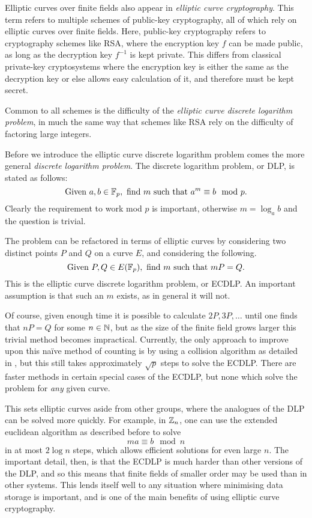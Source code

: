Elliptic curves over finite fields also appear in \emph{elliptic curve cryptography}.
This term refers to multiple schemes of public-key cryptography, all of which rely on elliptic curves over finite fields.
Here, public-key cryptography refers to cryptography schemes like RSA, where the encryption key $f$ can be made public, as long as the decryption key $f^{-1}$ is kept private.
This differs from classical private-key cryptosystems where the encryption key is either the same as the decryption key or else allows easy calculation of it, and therefore must be kept secret.

Common to all schemes is the difficulty of the \emph{elliptic curve discrete logarithm problem}, in much the same way that schemes like RSA rely on the difficulty of factoring large integers.

Before we introduce the elliptic curve discrete logarithm problem comes the more general \emph{discrete logarithm problem}.
The discrete logarithm problem, or DLP, is stated as follows:
$$\text{Given }a,b \in \mathbb{F}_{p},\text{ find } m \text{ such that } a^m \equiv b \mod p.$$
Clearly the requirement to work mod $p$ is important, otherwise $m = \log_a b$ and the question is trivial.

The problem can be refactored in terms of elliptic curves by considering two distinct points $P$ and $Q$ on a curve $E$, and considering the following.
$$\text{Given }P,Q \in E(\mathbb{F}_{p}),\text{ find } m \text{ such that } mP = Q.$$
This is the elliptic curve discrete logarithm problem, or ECDLP.
An important assumption is that such an $m$ exists, as in general it will not.

Of course, given enough time it is possible to calculate $2P,3P,\ldots$ until one finds that $nP = Q$ for some $n\in\mathbb{N}$, but as the size of the finite field grows larger this trivial method becomes impractical.
Currently, the only approach to improve upon this naïve method of counting is by using a collision algorithm as detailed in \cite{tate2013}, but this still takes approximately $\sqrt{p}$ steps to solve the ECDLP.
There are faster methods in certain special cases of the ECDLP, but none which solve the problem for \emph{any} given curve.

This sets elliptic curves aside from other groups, where the analogues of the DLP can be solved more quickly.
For example, in $\mathbb{Z}_{n}$, one can use the extended euclidean algorithm as described before to solve
$$ma \equiv b \mod n$$
in at most $2\log n$ steps, which allows efficient solutions for even large $n$.
The important detail, then, is that the ECDLP is much harder than other versions of the DLP, and so this means that finite fields of smaller order may be used than in other systems.
This lends itself well to any situation where minimising data storage is important, and is one of the main benefits of using elliptic curve cryptography.
